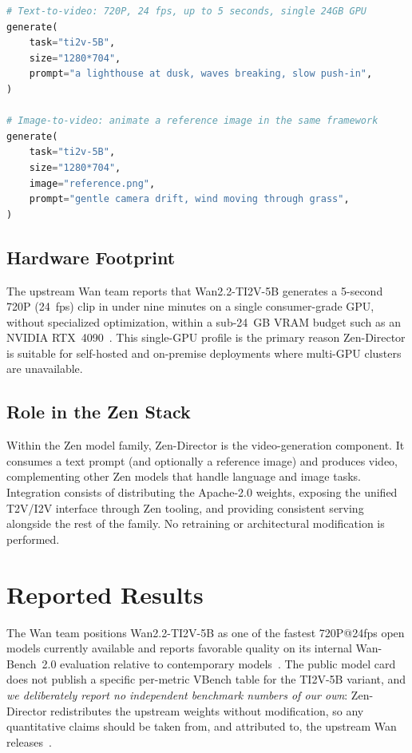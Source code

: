 \documentclass[11pt,a4paper]{article}
\begin{document}
\begin{lstlisting}[language=Python, caption=Invoking Zen-Director (Wan2.2-TI2V-5B)]
# Text-to-video: 720P, 24 fps, up to 5 seconds, single 24GB GPU
generate(
    task="ti2v-5B",
    size="1280*704",
    prompt="a lighthouse at dusk, waves breaking, slow push-in",
)

# Image-to-video: animate a reference image in the same framework
generate(
    task="ti2v-5B",
    size="1280*704",
    image="reference.png",
    prompt="gentle camera drift, wind moving through grass",
)
\end{lstlisting}

\subsection{Hardware Footprint}

The upstream Wan team reports that Wan2.2-TI2V-5B generates a 5-second 720P (24~fps) clip in
under nine minutes on a single consumer-grade GPU, without specialized optimization, within a
sub-24~GB VRAM budget such as an NVIDIA RTX~4090~\cite{wan22hf,wan22github}. This single-GPU
profile is the primary reason Zen-Director is suitable for self-hosted and on-premise
deployments where multi-GPU clusters are unavailable.

\subsection{Role in the Zen Stack}

Within the Zen model family, Zen-Director is the video-generation component. It consumes a text
prompt (and optionally a reference image) and produces video, complementing other Zen models
that handle language and image tasks. Integration consists of distributing the Apache-2.0
weights, exposing the unified T2V/I2V interface through Zen tooling, and providing consistent
serving alongside the rest of the family. No retraining or architectural modification is
performed.

\section{Reported Results}

The Wan team positions Wan2.2-TI2V-5B as one of the fastest 720P@24fps open models currently
available and reports favorable quality on its internal Wan-Bench~2.0 evaluation relative to
contemporary models~\cite{wan22github}. The public model card does not publish a specific
per-metric VBench table for the TI2V-5B variant, and \emph{we deliberately report no
independent benchmark numbers of our own}: Zen-Director redistributes the upstream weights
without modification, so any quantitative claims should be taken from, and attributed to, the
upstream Wan releases~\cite{wan22hf,wan22github,wan21paper}.
\end{document}
